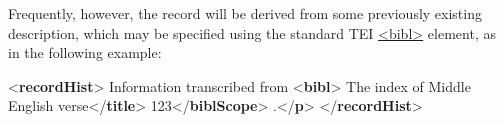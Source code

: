 Frequently, however, the record will be derived from some previously existing description, which may be specified using the standard TEI \hyperref[TEI.bibl]{<bibl>} element, as in the following example: \par\bgroup{}\exampleFont \begin{shaded}\noindent\mbox{}{<\textbf{recordHist}>}\mbox{}\newline 
{}\mbox{}\newline 
\hspace*{1em}Information transcribed from {<\textbf{bibl}>}\mbox{}\newline 
\hspace*{1em}\hspace*{1em}\hspace*{1em}The index of Middle English\mbox{}\newline 
\hspace*{1em}\hspace*{1em}\hspace*{1em}\hspace*{1em}\hspace*{1em}\hspace*{1em}\hspace*{1em}\hspace*{1em} verse{</\textbf{title}>}\mbox{}\newline 
\hspace*{1em}\hspace*{1em}\hspace*{1em}123{</\textbf{biblScope}>}\mbox{}\newline 
\hspace*{1em}\hspace*{1em}.{</\textbf{p}>}\mbox{}\newline 
{}\mbox{}\newline 
{</\textbf{recordHist}>}\end{shaded}\egroup\par \par
